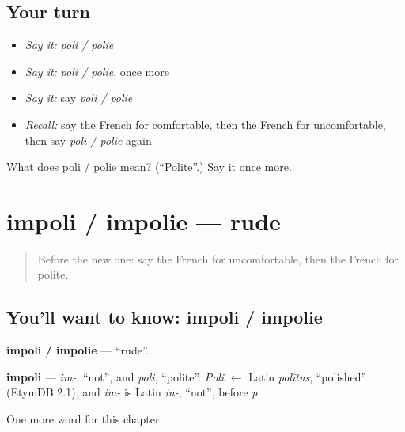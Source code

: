 \subsection*{Your turn}
\begin{itemize}
\raggedright
  \item \emph{Say it:} \emph{poli / polie}
  \item \emph{Say it:} \emph{poli / polie}, once more
  \item \emph{Say it:} say \emph{poli / polie}
  \item \emph{Recall:} say the French for comfortable, then the French for uncomfortable, then say \emph{poli / polie} again
\end{itemize}

\begin{tcolorbox}[breakable,colback=teal!4,colframe=teal!35!black,title={Before you move on}]
What does poli / polie mean? (\textquotedblleft{}Polite\textquotedblright{}.) Say it once more.
\end{tcolorbox}
\section[impoli / impolie]{impoli / impolie — rude}

\label{lesson:FR-C159-impoli-impolie}



\begin{quote}
Before the new one: say the French for uncomfortable, then the French for polite.
\end{quote}

\subsection*{You'll want to know: impoli / impolie}
\textbf{impoli / impolie} — \textquotedblleft{}rude\textquotedblright{}.

\begin{cousinweb}
\textbf{impoli} — \emph{im-}, \textquotedblleft{}not\textquotedblright{}, and \emph{poli}, \textquotedblleft{}polite\textquotedblright{}. \emph{Poli} $\leftarrow$ Latin \emph{polītus}, \textquotedblleft{}polished\textquotedblright{} (EtymDB 2.1), and \emph{im-} is Latin \emph{in-}, \textquotedblleft{}not\textquotedblright{}, before \emph{p}.
\end{cousinweb}

\begin{grammarlens}[title={What you've built}]
One more word for this chapter.
\end{grammarlens}

